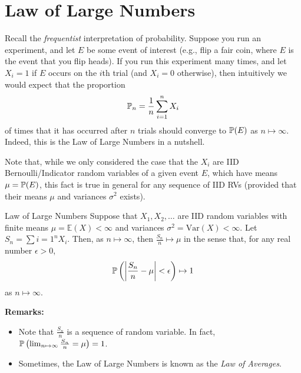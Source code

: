 \documentclass[letterpaper]{article}
\begin{document}
\section{Law of Large Numbers}
Recall the \emph{frequentist} interpretation of probability. Suppose you run an experiment, and let $E$ be some event of interest (e.g., flip a fair coin, where $E$ is the event that you flip heads). If you run this experiment many times, and let $X_i = 1$ if $E$ occurs on the $i$th trial (and $X_i = 0$ otherwise), then intuitively we would expect that the proportion 
\[\mathbb{P}_n = \frac{1}{n} \sum_{i = 1}^{n} X_i\]
of times that it has occurred after $n$ trials should converge to $\mathbb{P}(E)$ as $n \mapsto \infty$. Indeed, this is the Law of Large Numbers in a nutshell. 

\bigskip 

Note that, while we only considered the case that the $X_i$ are IID Bernoulli/Indicator random variables of a given event $E$, which have means $\mu = \mathbb{P}(E)$, this fact is true in general for any sequence of IID RVs (provided that their means $\mu$ and variances $\sigma^2$ exists). 

\begin{theorem}{Law of Large Numbers}{}
    Suppose that $X_1, X_2, \dots$ are IID random variables with finite means $\mu = \mathbb{E}(X) < \infty$ and variances $\sigma^2 = \text{Var}(X) < \infty$. Let $S_n = \sum{i = 1}^{n} X_i$. Then, as $n \mapsto \infty$, then $\frac{S_n}{n} \mapsto \mu$ in the sense that, for any real number $\epsilon > 0$, 
    \[\mathbb{P}\left(\left|\frac{S_n}{n} - \mu\right| < \epsilon\right) \mapsto 1\]
    as $n \mapsto \infty$. 
\end{theorem}
\textbf{Remarks:}
\begin{itemize}
    \item Note that $\frac{S_n}{n}$ is a sequence of random variable. In fact, $\mathbb{P}\left(\lim_{n \mapsto \infty} \frac{S_n}{n} = \mu\right) = 1$.
    \item Sometimes, the Law of Large Numbers is known as the \emph{Law of Averages}.
\end{itemize} 

\bigskip 
\end{document}
